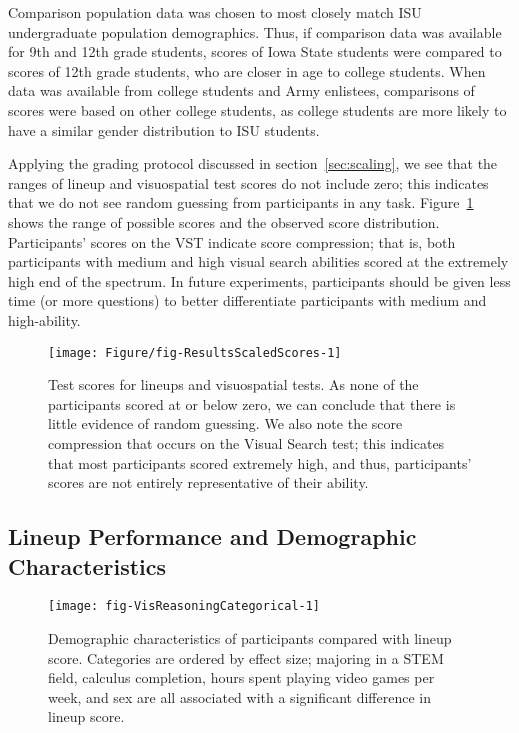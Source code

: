 \documentclass[journal]{vgtc}\usepackage[]{graphicx}\usepackage[]{color}
\begin{document}
Comparison population data was chosen to most closely match ISU undergraduate population demographics. Thus, if comparison data was available for 9th and 12th grade students, scores of Iowa State students were compared to scores of 12th grade students, who are closer in age to college students. When data was available from college students and Army enlistees, comparisons of scores were based on other college students, as college students are more likely to have a similar gender distribution to ISU students.

Applying the grading protocol discussed in section~\ref{sec:scaling}, we see that the ranges of lineup and visuospatial test scores do not include zero; this indicates that we do not see random guessing from participants in any task. Figure~\ref{fig:Scores} shows the range of possible scores and the observed score distribution. 
Participants' scores on the VST indicate score compression; that is, both participants with medium and high visual search abilities scored at the extremely high end of the spectrum. 
In future experiments, participants should be given less time (or more questions) to better differentiate participants with medium and high-ability.


\begin{figure}[ht]
\centering
\texttt{[image: Figure/fig-ResultsScaledScores-1]}
\caption{Test scores for lineups and visuospatial tests. As none of the participants scored at or below zero, we can conclude that there is little evidence of random guessing. We also note the score compression that occurs on the Visual Search test; this indicates that most participants scored extremely high, and thus, participants' scores are not entirely representative of their ability. \label{fig:Scores}}
\end{figure}
% 



\subsection{Lineup Performance and Demographic Characteristics}


\begin{figure}[h!tb]\centering
\texttt{[image: fig-VisReasoningCategorical-1]}
\caption[Visual Aptitude Study Results]{Demographic characteristics of participants compared with lineup score. Categories are ordered by effect size; majoring in a STEM field, calculus completion, hours spent playing video games per week, and sex are all associated with a significant difference in lineup score. }\label{fig:visualaptitudecat}
\end{figure}
\end{document}
